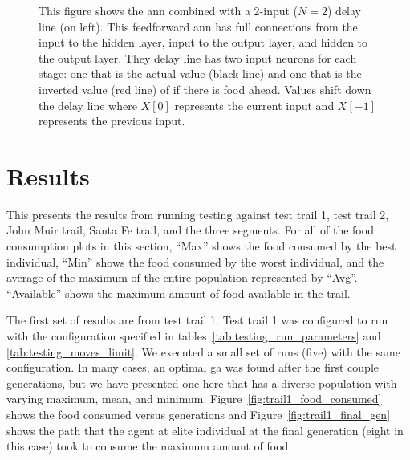 \begin{figure}
\caption[Delay Line with ANN for Trails]{This figure shows the \gls{ann} combined with a 2-input ($N=2$) delay line (on left). This feedforward \gls{ann} has full connections from the input to the hidden layer, input to the output layer, and hidden to the output layer. They delay line has two input neurons for each stage: one that is the actual value (black line) and one that is the inverted value (red line) of if there is food ahead. Values shift down the delay line where $X[0]$ represents the current input and $X[-1]$ represents the previous input.}
\label{fig:trail_ann_w_dl2}
\end{figure}

\section{Results}
\label{sec:tools_testing_results}
This presents the results from running testing against test trail 1, test trail 2, John Muir trail, Santa Fe trail, and the three segments. For all of the food consumption plots in this section, ``Max'' shows the food consumed by the best individual, ``Min'' shows the food consumed by the worst individual, and the average of the maximum of the entire population represented by ``Avg''. ``Available'' shows the maximum amount of food available in the trail. 

The first set of results are from test trail 1. Test trail 1 was configured to run with the configuration specified in tables~\ref{tab:testing_run_parameters} and \ref{tab:testing_moves_limit}. We executed a small set of runs (five) with the same configuration. In many cases, an optimal \gls{ga} was found after the first couple generations, but we have presented one here that has a diverse population with varying maximum, mean, and minimum. Figure~\ref{fig:trail1_food_consumed} shows the food consumed versus generations and Figure~\ref{fig:trail1_final_gen} shows the path that the agent at elite individual at the final generation (eight in this case) took to consume the maximum amount of food.

